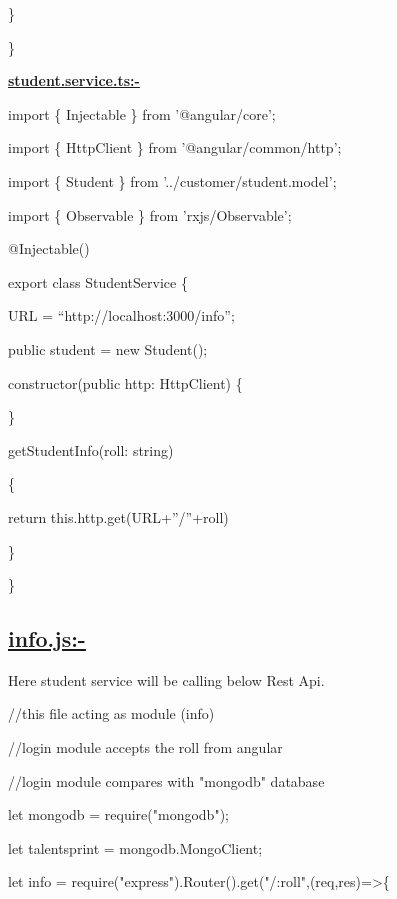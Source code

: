 \documentclass[11pt,twoside]{article}
\begin{document}
  \hspace*{25}\}

\}

\vspace{2\baselineskip}
\textbf{\uline{student.service.ts:-}}

\vspace{1\baselineskip}
import \{ Injectable \} from '@angular/core';

import \{ HttpClient \} from '@angular/common/http'; 

import \{ Student \} from '../customer/student.model'; 

import \{ Observable \} from 'rxjs/Observable'; 

@Injectable()

\vspace{1\baselineskip}
export class StudentService \{

\vspace{1\baselineskip}
URL = “http://localhost:3000/info”;

public student = new Student();

\vspace{1\baselineskip}
constructor(public http: HttpClient) \{

\vspace{1\baselineskip}
\}

getStudentInfo(roll: string) 

\{

  \hspace*{25}return this.http.get(URL+”/”+roll) 

\}

\}


\subsection*{\uline{info.js:-}}

\vspace{1\baselineskip}
Here student service will be calling below Rest Api. 

//this file acting as module (info)

//login module accepts the roll from angular

//login module compares with "mongodb" database

\vspace{1\baselineskip}
let mongodb = require("mongodb");

let talentsprint = mongodb.MongoClient;

\vspace{1\baselineskip}
let info = require("express").Router().get("/:roll",(req,res)=>\{ 
\end{document}
